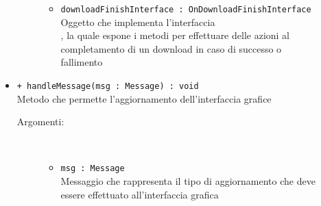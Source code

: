 \documentclass[../Tesi.tex]{subfiles}
\begin{document}
\begin{description}
\begin{itemize}
\begin{description}
\begin{itemize}
						\item \texttt{downloadFinishInterface : OnDownloadFinishInterface}\\
						Oggetto che implementa l'interfaccia \\, la quale espone i metodi per effettuare delle azioni al completamento di un download in caso di successo o fallimento
					\end{itemize}
				\end{description}

				\item \texttt{+ handleMessage(msg : Message) : void}\\
				Metodo che permette l'aggiornamento dell'interfaccia grafice
				\begin{description}
					\item[Argomenti:] \
					\begin{itemize}
						\item \texttt{msg : Message}\\
						Messaggio che rappresenta il tipo di aggiornamento che deve essere effettuato all'interfaccia grafica
					\end{itemize}
				\end{description}
			\end{itemize}
		\end{description}
\end{document}
